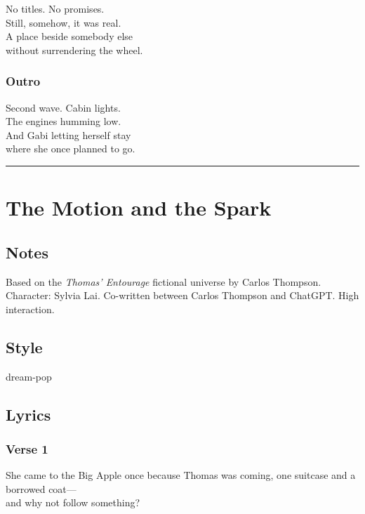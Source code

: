 No titles. No promises.\\
Still, somehow, it was real.\\
A place beside somebody else\\
without surrendering the wheel.

\subsubsection{Outro}\label{outro-3}

Second wave. Cabin lights.\\
The engines humming low.\\
And Gabi letting herself stay\\
where she once planned to go.

\begin{center}\rule{0.5\linewidth}{0.5pt}\end{center}

\section{The Motion and the Spark}\label{the-motion-and-the-spark}

\subsection{Notes}\label{notes-14}

Based on the \emph{Thomas' Entourage} fictional universe by Carlos
Thompson. Character: Sylvia Lai. Co-written between Carlos Thompson and
ChatGPT. High interaction.

\subsection{Style}\label{style-13}

dream-pop

\subsection{Lyrics}\label{lyrics-13}

\subsubsection{Verse 1}\label{verse-1-9}

She came to the Big Apple once because Thomas was coming, one suitcase
and a borrowed coat---\\
and why not follow something?

